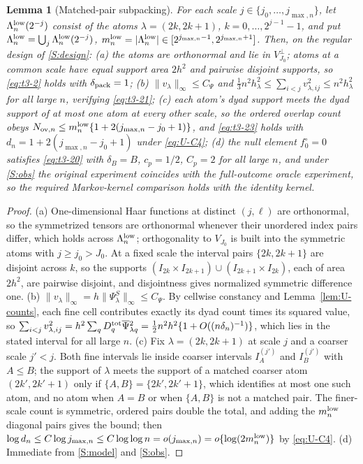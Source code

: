\documentclass[11pt]{article}
\newtheorem{lemma}[theorem]{Lemma}
\theoremstyle{definition}
\newcommand{\1}{\mathbf 1}\newcommand{\op}{\operatorname}
\begin{document}
\begin{lemma}[Matched-pair subpacking]\label{lem:U-pack}
For each scale $j\in\{j_0,\dots,j_{\max,n}\}$, let
$\Lambda_n^{\rm low}(2^{-j})$ consist of the atoms
$\lambda=(2k,2k+1)$, $k=0,\dots,2^{j-1}-1$, and put
$\Lambda_n^{\rm low}=\bigcup_j\Lambda_n^{\rm low}(2^{-j})$,
$m_n^{\rm low}=|\Lambda_n^{\rm low}|\in[2^{j_{\max,n}-1},2^{j_{\max,n}+1}]$.
Then, on the regular design of \ref{S:design}:
\textup{(a)} the atoms are orthonormal and lie in $V_{J_0}^\perp$; atoms at a
common scale have equal support area $2h^2$ and pairwise disjoint supports, so
\eqref{eq:t3-2} holds with $\delta_{\rm pack}=1$;
\textup{(b)} $\|v_\lambda\|_\infty\le C_\Psi$ and
$\tfrac13n^2h_\lambda^2\le\sum_{i<j}v_{\lambda,ij}^2\le n^2h_\lambda^2$ for all
large $n$, verifying \eqref{eq:t3-21};
\textup{(c)} each atom's dyad support meets the dyad support of at most one
atom at every other scale, so the ordered overlap count obeys
$N_{{\rm ov},n}\le m_n^{\rm low}\{1+2(j_{\max,n}-j_0+1)\}$, and
\eqref{eq:t3-23} holds with
$d_n=1+2(j_{\max,n}-j_0+1)$ under \eqref{eq:U-C4};
\textup{(d)} the null element $f_0^\circ=0$ satisfies \eqref{eq:t3-20} with
$\delta_B=B$, $c_p=1/2$, $C_p=2$ for all large $n$, and under
\ref{S:obs} the original experiment coincides with the full-outcome oracle
experiment, so the required Markov-kernel comparison holds with the identity
kernel.
\end{lemma}

\begin{proof}
(a) One-dimensional Haar functions at distinct $(j,\ell)$ are orthonormal, so
the symmetrized tensors are orthonormal whenever their unordered index pairs
differ, which holds across $\Lambda_n^{\rm low}$; orthogonality to $V_{J_0}$ is built into the symmetric atoms with $j\ge j_0>J_0$.  At a fixed scale the interval pairs
$\{2k,2k+1\}$ are disjoint across $k$, so the supports
$(I_{2k}\times I_{2k+1})\cup(I_{2k+1}\times I_{2k})$, each of area $2h^2$, are
pairwise disjoint, and disjointness gives normalized symmetric difference one.
(b) $\|v_\lambda\|_\infty=h\|\Psi_\lambda^S\|_\infty\le C_\Psi$.  By cellwise
constancy and Lemma~\ref{lem:U-counts}, each fine cell contributes exactly its
dyad count times its squared value, so
$\sum_{i<j}v^2_{\lambda,ij}
=h^2\sum_qD_q^{\rm tot}\overline\Psi{}^2_{\lambda q}
=\tfrac12n^2h^2\{1+O((n\delta_n)^{-1})\}$,
which lies in the stated interval for all large $n$.
(c) Fix $\lambda=(2k,2k+1)$ at scale $j$ and a coarser scale $j'<j$.  Both fine
intervals lie inside coarser intervals $I_A^{(j')}$ and $I_B^{(j')}$ with
$A\le B$; the support of $\lambda$ meets the support of a matched coarser atom
$(2k',2k'+1)$ only if $\{A,B\}=\{2k',2k'+1\}$, which identifies at most one
such atom, and no atom when $A=B$ or when $\{A,B\}$ is not a matched pair.  The
finer-scale count is symmetric, ordered pairs double the total, and adding the
$m_n^{\rm low}$ diagonal pairs gives the bound; then
$\log d_n\le C\log j_{\max,n}\le C\log\log n=o(j_{\max,n})
=o\{\log(2m_n^{\rm low})\}$ by \eqref{eq:U-C4}.
(d) Immediate from \ref{S:model} and \ref{S:obs}.
\end{proof}
\end{document}
